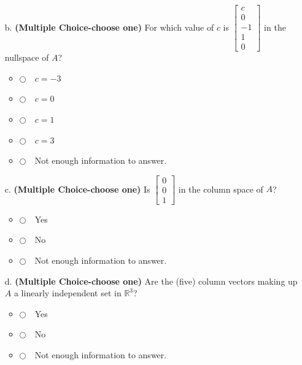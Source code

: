 \documentclass[12pt]{extarticle}
\newcommand{\chooseone}{{\Large$\Circle$\ \ }}
\begin{document}
\begin{enumerate}
\begin{itemize}
     \vspace{0.25in}

     \item[b.] \textbf{(Multiple Choice-choose one)}  For which value of $c$ is $\begin{bmatrix} c \\ 0 \\ -1 \\ 1\\0\end{bmatrix}$ in the nullspace of $A$?
\begin{itemize}[label={}]
\item \chooseone $c=-3$
\item \chooseone $c=0$
\item \chooseone $c=1$
\item \chooseone $c=3$
\item \chooseone Not enough information to answer.
\end{itemize}  


     \item[c.] \textbf{(Multiple Choice-choose one)} Is $\begin{bmatrix} 0 \\ 0 \\ 1\end{bmatrix}$ in the column space of $A$?
\begin{itemize}[label={}]
\item \chooseone Yes
\item \chooseone No
\item \chooseone Not enough information to answer.
\end{itemize}    
     
     \vspace{0.25in}

\item[d.] \textbf{(Multiple Choice-choose one)} Are the (five) column vectors making up $A$ a linearly independent set in $\mathbb{R}^3$?
\begin{itemize}[label={}]
\item \chooseone Yes
\item \chooseone No
\item \chooseone Not enough information to answer.
\end{itemize}    
     
     \vspace{0.5in}

    \end{itemize} 


\end{enumerate}
\end{document}
